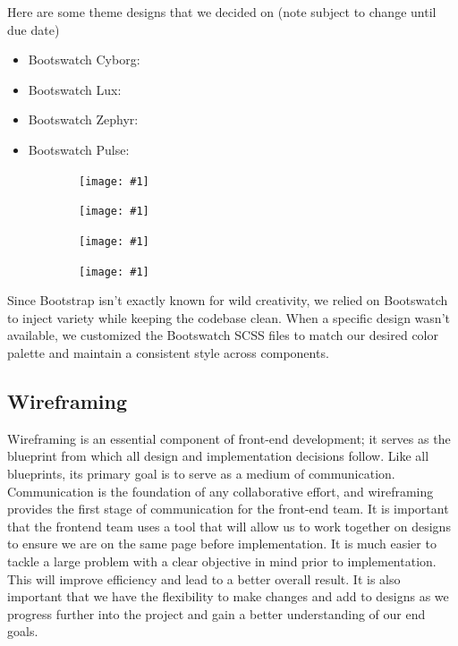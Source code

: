 \documentclass[12pt]{article}
\newcommand{\simplegraphic}[3] {
\begin{figure}[H]
	\centering
	\texttt{[image: \#1]}
	\caption{#2}
	\label{#3}
\end{figure}
}
\begin{document}
Here are some theme designs that we decided on (note subject to change until due date)
\begin{itemize}
    \item Bootswatch Cyborg:
    \item Bootswatch Lux:
    \item Bootswatch Zephyr:
    \item Bootswatch Pulse:
\end{itemize}
\begin{figure}[H]
  \centering
  \begin{minipage}{0.25\textwidth}
    \simplegraphic{cyborg}{}{fig:cyborg}
  \end{minipage}\hfill
  \begin{minipage}{0.25\textwidth}
    \simplegraphic{lux}{}{fig:lux}
  \end{minipage}\hfill
  \begin{minipage}{0.25\textwidth}
    \simplegraphic{zephyr}{}{fig:zephyr}
  \end{minipage}\hfill
  \begin{minipage}{0.25\textwidth}
    \simplegraphic{pulse}{}{fig:pulse}
  \end{minipage}
\end{figure}
Since Bootstrap isn’t exactly known for wild creativity, we relied on Bootswatch to inject variety while keeping the codebase clean.
When a specific design wasn’t available, we customized the Bootswatch SCSS files to match our desired color palette and maintain a consistent style across components.

\subsection{Wireframing}
Wireframing is an essential component of front-end development; it serves as the blueprint from which all design and implementation decisions follow.  Like all blueprints, its primary goal is to serve as a medium of communication. Communication is the foundation of any collaborative effort, and wireframing provides the first stage of communication for the front-end team. It is important that the frontend team uses a tool that will allow us to work together on designs to ensure we are on the same page before implementation. It is much easier to tackle a large problem with a clear objective in mind prior to implementation. This will improve efficiency and lead to a better overall result. It is also important that we have the flexibility to make changes and add to designs as we progress further into the project and gain a better understanding of our end goals.
\end{document}
